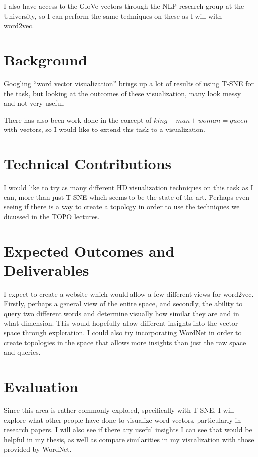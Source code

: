 \documentclass{article}
\begin{document}
I also have access to the GloVe vectors through the NLP research group at the University, so I can perform the same techniques on these as I will with word2vec. 

\section{Background}

Googling ``word vector visualization'' brings up a lot of results of using T-SNE for the task, but looking at the outcomes of these visualization, many look messy and not very useful. 

There has also been work done in the concept of $king - man + woman = queen$ with vectors, so I would like to extend this task to a visualization. 

\section{Technical Contributions}

I would like to try as many different HD visualization techniques on this task as I can, more than just T-SNE which seems to be the state of the art. Perhaps even seeing if there is a way to create a topology in order to use the techniques we dicussed in the TOPO lectures. 

\section{Expected Outcomes and Deliverables}

I expect to create a website which would allow a few different views for word2vec. Firstly, perhaps a general view of the entire space, and secondly, the ability to query two different words and determine visually how similar they are and in what dimension. This would hopefully allow different insights into the vector space through exploration. I could also try incorporating WordNet in order to create topologies in the space that allows more insights than just the raw space and queries. 

\section{Evaluation}

Since this area is rather commonly explored, specifically with T-SNE, I will explore what other people have done to visualize word vectors, particularly in research papers. I will also see if there any useful insights I can see that would be helpful in my thesis, as well as compare similarities in my visualization with those provided by WordNet. 
\end{document}
